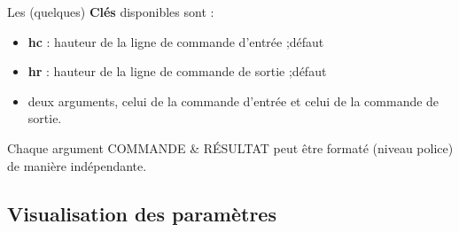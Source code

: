 \documentclass{article}
\newcommand\Cle[1]{{\bfseries\sffamily\textlangle #1\textrangle}}
\begin{document}
\smallskip

\begin{codetex}
\end{codetex}

\smallskip

\begin{codecles}
Les (quelques) \Cle{Clés} disponibles sont :

\begin{itemize}
	\item \Cle{hc} : hauteur de la ligne de commande d'entrée ;\hfill{}défaut \Cle{0.75}
	\item \Cle{hr} : hauteur de la ligne de commande de sortie ;\hfill{}défaut \Cle{0.75}
	\item deux \textsf{arguments}, celui de la commande d'entrée et celui de la commande de sortie.
\end{itemize}
%
Chaque argument \textsf{COMMANDE} \& \textsf{RÉSULTAT} peut être formaté (niveau police) de manière indépendante.
\end{codecles}

\smallskip

\begin{codetex}
\paramCF[titre=true,couleurcmd=olive,couleurres=orange]
\end{codetex}

\subsection{Visualisation des paramètres}
\end{document}
